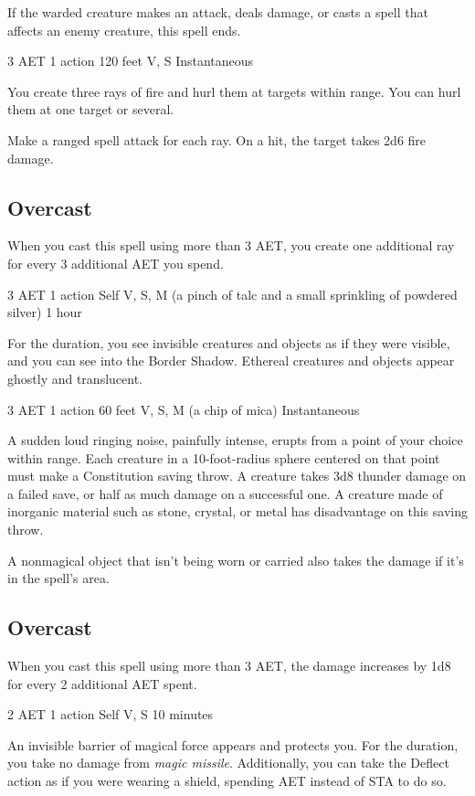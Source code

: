 If the warded creature makes an attack, deals damage, or casts a spell that affects an enemy creature, this spell ends.


{3 AET}
{1 action}
{120 feet}
{V, S}
{Instantaneous}

You create three rays of fire and hurl them at targets within range. You can hurl them at one target or several.

Make a ranged spell attack for each ray. On a hit, the target takes 2d6 fire damage.

\subsection*{Overcast} When you cast this spell using more than 3 AET, you create one additional ray for every 3 additional AET you spend.


{3 AET}
{1 action}
{Self}
{V, S, M (a pinch of talc and a small sprinkling of powdered silver)}
{1 hour}

For the duration, you see invisible creatures and objects as if they were visible, and you can see into the Border Shadow. Ethereal creatures and objects appear ghostly and translucent.


{3 AET}
{1 action}
{60 feet}
{V, S, M (a chip of mica)}
{Instantaneous}

A sudden loud ringing noise, painfully intense, erupts from a point of your choice within range. Each creature in a 10-foot-radius sphere centered on that point must make a Constitution saving throw. A creature takes 3d8 thunder damage on a failed save, or half as much damage on a successful one. A creature made of inorganic material such as stone, crystal, or metal has disadvantage on this saving throw.

A nonmagical object that isn't being worn or carried also takes the damage if it's in the spell's area.

\subsection*{Overcast} When you cast this spell using more than 3 AET, the damage increases by 1d8 for every 2 additional AET spent.


{2 AET}
{1 action}
{Self}
{V, S}
{10 minutes}

An invisible barrier of magical force appears and protects you. For the duration, you take no damage from \textit{magic missile}. Additionally, you can take the Deflect action as if you were wearing a shield, spending AET instead of STA to do so.


